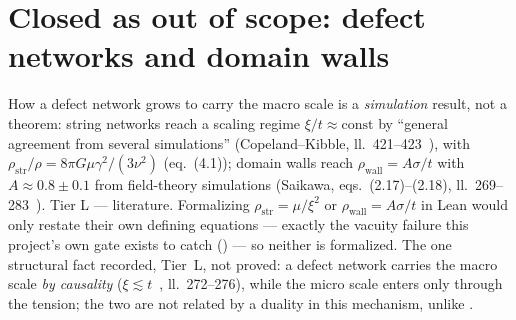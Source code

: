 \documentclass[11pt,a4paper]{article}
\theoremstyle{remark}
\newcommand{\tierL}{\colorbox{blue!10}{\textsf{\scriptsize Tier L --- literature}}}
\begin{document}
\section{Closed as out of scope: defect networks and domain walls}
\label{sec:outofscope}
How a defect network grows to carry the macro scale is a \emph{simulation} result, not a theorem:
string networks reach a scaling regime $\xi/t\approx\text{const}$ by ``general agreement from
several simulations'' (Copeland--Kibble, ll.~421--423~\cite{CopelandKibble2009}), with
$\rho_{\mathrm{str}}/\rho=8\pi G\mu\gamma^2/(3\nu^2)$ (eq.~(4.1)); domain walls reach
$\rho_{\mathrm{wall}}=A\sigma/t$ with $A\approx0.8\pm0.1$ from field-theory simulations
(Saikawa, eqs.~(2.17)--(2.18), ll.~269--283~\cite{Saikawa2017}). \tierL. Formalizing
$\rho_{\mathrm{str}}=\mu/\xi^2$ or $\rho_{\mathrm{wall}}=A\sigma/t$ in Lean would only restate
their own defining equations --- exactly the vacuity failure this project's own gate exists to
catch () --- so neither is formalized. The one structural fact recorded, Tier~L,
not proved: a defect network carries the macro scale \emph{by causality}
($\xi\lesssim t$~\cite{CopelandKibble2009}, ll.~272--276), while the micro scale enters only
through the tension; the two are not related by a duality in this mechanism, unlike
.

\end{document}
